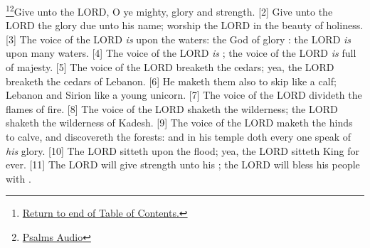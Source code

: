 \footnote{\textcolor[cmyk]{0.99998,1,0,0}{\hyperlink{TOC}{Return to end of Table of Contents.}}}\footnote{\href{https://www.audioverse.org/english/audiobibles/books/ENGKJV/O/Ps/1}{\textcolor[cmyk]{0.99998,1,0,0}{Psalms Audio}}}\textcolor[cmyk]{0.99998,1,0,0}{Give unto the LORD, O ye mighty,  glory and strength.}
[2] \textcolor[cmyk]{0.99998,1,0,0}{Give unto the LORD the glory due unto his name; worship the LORD in the beauty of holiness.}
[3] \textcolor[cmyk]{0.99998,1,0,0}{The voice of the LORD \emph{is} upon the waters: the God of glory : the LORD \emph{is} upon many waters.}
[4] \textcolor[cmyk]{0.99998,1,0,0}{The voice of the LORD \emph{is} ; the voice of the LORD \emph{is} full of majesty.}
[5] \textcolor[cmyk]{0.99998,1,0,0}{The voice of the LORD breaketh the cedars; yea, the LORD breaketh the cedars of Lebanon.}
[6] \textcolor[cmyk]{0.99998,1,0,0}{He maketh them also to skip like a calf; Lebanon and Sirion like a young unicorn.}
[7] \textcolor[cmyk]{0.99998,1,0,0}{The voice of the LORD divideth the flames of fire.}
[8] \textcolor[cmyk]{0.99998,1,0,0}{The voice of the LORD shaketh the wilderness; the LORD shaketh the wilderness of Kadesh.}
[9] \textcolor[cmyk]{0.99998,1,0,0}{The voice of the LORD maketh the hinds to calve, and discovereth the forests: and in his temple doth every one speak of \emph{his} glory.}
[10] \textcolor[cmyk]{0.99998,1,0,0}{The LORD sitteth upon the flood; yea, the LORD sitteth King for ever.}
[11] \textcolor[cmyk]{0.99998,1,0,0}{The LORD will give strength unto his ; the LORD will bless his people with .}


